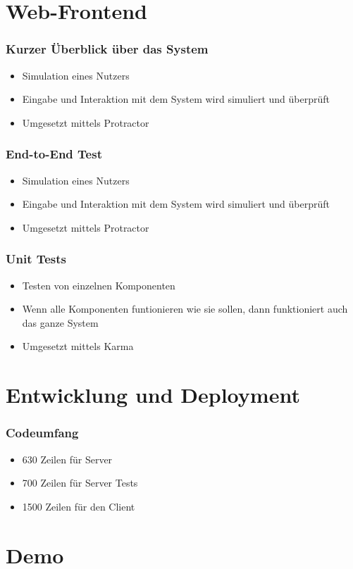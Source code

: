 \documentclass{beamer}
\begin{document}
\section{Web-Frontend}
\begin{frame}
    \frametitle{Kurzer Überblick über das System}
    \begin{itemize}
        \item Simulation eines Nutzers
        \item Eingabe und Interaktion mit dem System wird simuliert und überprüft
        \item Umgesetzt mittels Protractor
    \end{itemize}
\end{frame}
\begin{frame}
    \frametitle{End-to-End Test}
    \begin{itemize}
        \item Simulation eines Nutzers
        \item Eingabe und Interaktion mit dem System wird simuliert und überprüft
        \item Umgesetzt mittels Protractor
    \end{itemize}
\end{frame}
\begin{frame}
    \frametitle{Unit Tests}
    \begin{itemize}
        \item Testen von einzelnen Komponenten
        \item Wenn alle Komponenten funtionieren wie sie sollen, dann funktioniert auch das ganze System
        \item Umgesetzt mittels Karma
    \end{itemize}
\end{frame}

\section{Entwicklung und Deployment}
\begin{frame}
    \frametitle{Codeumfang}
    \begin{itemize}
        \item 630 Zeilen für Server
        \item 700 Zeilen für Server Tests
        \item 1500 Zeilen für den Client
    \end{itemize}
\end{frame}
\section{Demo}
\end{document}
